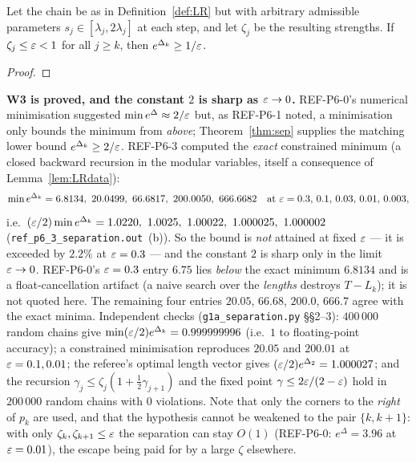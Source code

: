 \documentclass[11pt]{article}
\theoremstyle{definition}\newtheorem{example}[theorem]{Example}
\begin{document}
\begin{corollary}\label{cor:sep-admissible}
Let the chain be as in Definition~\ref{def:LR} but with arbitrary admissible parameters
$s_j\in[\lambda_j,2\lambda_j]$ at each step, and let $\zeta_j$ be the resulting strengths.  If
$\zeta_j\le\varepsilon<1$ for all $j\ge k$, then $e^{\Delta_k}\ge1/\varepsilon$.
\end{corollary}
\begin{proof}
\end{proof}

\begin{verdictok}
\textbf{W3 is proved, and the constant $2$ is sharp as $\varepsilon\to0$.}  REF-P6-0's numerical
minimisation suggested $\min e^{\Delta}\approx2/\varepsilon$ but, as REF-P6-1 noted, a minimisation only
bounds the minimum from \emph{above}; Theorem~\ref{thm:sep} supplies the matching lower bound
$e^{\Delta_k}\ge2/\varepsilon$.  REF-P6-3 computed the \emph{exact} constrained minimum (a closed
backward recursion in the modular variables, itself a consequence of Lemma~\ref{lem:LRdata}):
\[
 \min e^{\Delta_k}=6.8134,\ 20.0499,\ 66.6817,\ 200.0050,\ 666.6682
 \quad\text{at }\eps=0.3,\,0.1,\,0.03,\,0.01,\,0.003,
\]
i.e.\ $(\eps/2)\min e^{\Delta_k}=1.0220,\ 1.0025,\ 1.00022,\ 1.000025,\ 1.000002$
(\texttt{ref\_p6\_3\_separation.out}~(b)).  So the bound is \emph{not} attained at fixed $\varepsilon$
--- it is exceeded by $2.2\%$ at $\varepsilon=0.3$ --- and the constant $2$ is sharp only in the limit
$\varepsilon\to0$.  REF-P6-0's $\varepsilon=0.3$ entry $6.75$ lies \emph{below} the exact minimum $6.8134$ and
is a float-cancellation artifact (a naive search over the \emph{lengths} destroys $T-L_k$); it is
not quoted here.  The remaining four entries $20.05$, $66.68$, $200.0$, $666.7$ agree with the
exact minima.  Independent checks (\texttt{g1a\_separation.py} \S\S2--3): $400\,000$ random
chains give $\min(\varepsilon/2)e^{\Delta_k}=0.999999996$ (i.e.\ $1$ to floating-point accuracy); a
constrained minimisation reproduces $20.05$ and $200.01$ at $\varepsilon=0.1,0.01$; the referee's optimal
length vector gives $(\varepsilon/2)e^{\Delta_2}=1.000027$; and the recursion
$\gamma_j\le\zeta_j(1+\frac12\gamma_{j+1})$ and the fixed point $\gamma\le2\varepsilon/(2-\varepsilon)$ hold in
$200\,000$ random chains with $0$ violations.  Note that only the corners to the \emph{right} of
$p_k$ are used, and that the hypothesis cannot be weakened to the pair $\{k,k+1\}$: with only
$\zeta_k,\zeta_{k+1}\le\varepsilon$ the separation can stay $O(1)$ (REF-P6-0: $e^{\Delta}=3.96$ at
$\varepsilon=0.01$), the escape being paid for by a large $\zeta$ elsewhere.
\end{verdictok}
\end{document}
